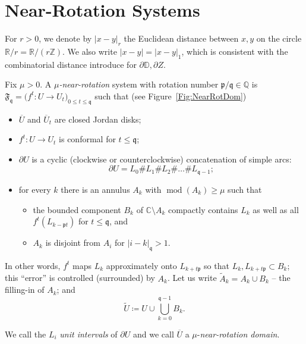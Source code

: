 \documentclass{amsart}
\newcommand{\1}{{\mathbb 1 }}
\newcommand{\epscasc}{{\mu}}
\newcommand{\tF}{{\mathfrak F}}
\newcommand{\pp}{\mathfrak{p}}
\newcommand{\qq}{\mathfrak{q}}
\newcommand{\C}{\mathbb{C}}
\newcommand{\Q}{\mathbb{Q}}
\newcommand{\R}{\mathbb{R}}
\newcommand{\Z}{\mathbb{Z}}
\newcommand{\Disk}{\mathbb{D}}
\theoremstyle{remark}
\numberwithin{equation}{section}
\theoremstyle{definition}
\renewcommand{\mod}{\operatorname{mod}}
\begin{document}
\section{Near-Rotation Systems}
\label{s:NearRotatSystem}



For $r>0$, we denote by $|x-y|_r$ the Euclidean distance between $x,y$ on the circle $\R/r=\R /(r\Z)$. We also write $|x-y| = |x-y|_1$, which is consistent with the combinatorial distance introduce for $\partial \Disk, \partial Z$.

Fix $\epscasc>0$. A \emph{$\epscasc$-near-rotation} system with rotation number $\pp/\qq \in \Q$ is $\tF_\qq=\big( f^t \colon U\to U_t\big)_{0
\le t \le \qq}$ such that (see Figure~\ref{Fig:NearRotDom})
\begin{itemize}
\item[(A)] $\overline U$ and $\overline U_t$ are closed Jordan disks;
\item[(B)] $f^t \colon U\to U_t$ is conformal for $t\le \qq$;
\item[(C)] $\partial U$ is a cyclic (clockwise or counterclockwise) concatenation of simple arcs: 
\begin{equation}
\label{eq:part U:unit intervals}
\partial U =L_{0}\# L_1\# L_2\#\dots\# L_{\qq-1};
\end{equation}
\item[(D)] for every $k$ there is an annulus $A_k$ with $\mod(A_k)\ge \epscasc$ such that 
\begin{itemize}
\item[(D1)] the bounded component $B_k$ of $\C\setminus A_k$ compactly contains 
$L_k$ as well as all $f^t (L_{k-\pp t})$ for $t \le \qq$, and
\item[(D2)] $A_k$ is disjoint from $A_i$ for $|i-k|_\qq>1$.
\end{itemize}
\end{itemize}


In other words, $f^{t}$ maps $L_k$ approximately onto $L_{k + t\pp}$ so that $L_k,L_{k + t\pp}\subset B_k$; this ``error'' is controlled (surrounded) by $A_k$. Let us write $\widetilde A_k=A_k\cup B_k$ -- the filling-in of $A_k$; and 
 \[\widetilde U\coloneqq U\cup \bigcup_{k=0}^{\qq-1} B_k.\]

We call the $L_i$ \emph{unit intervals} of $\partial U$ and we call $\overline U$ a $\epscasc$-\emph{near-rotation domain}.
\end{document}
